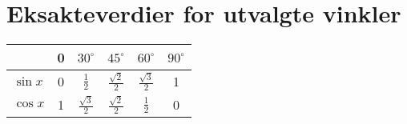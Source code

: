 



	
\section{Eksakteverdier for utvalgte vinkler}
\begin{center}
	\renewcommand{\arraystretch}{1.5}	
	\begin{tabular}{l|c|c|c|c|c}
		& 0&$30^\circ$ & $45^\circ$ &$60^\circ$ & $90^\circ$    \\
		\hline
		$\sin x$ & 0 &$\frac{1}{2}$ & $\frac{\sqrt{2}}{2}$ & $\frac{\sqrt{3}}{2}$ & 1 \\
		$\cos x$ & 1 & $\frac{\sqrt{3}}{2}$ & $\frac{\sqrt{2}}{2}$ & $\frac{1}{2}$ & 0 \\
	\end{tabular}
\end{center}
